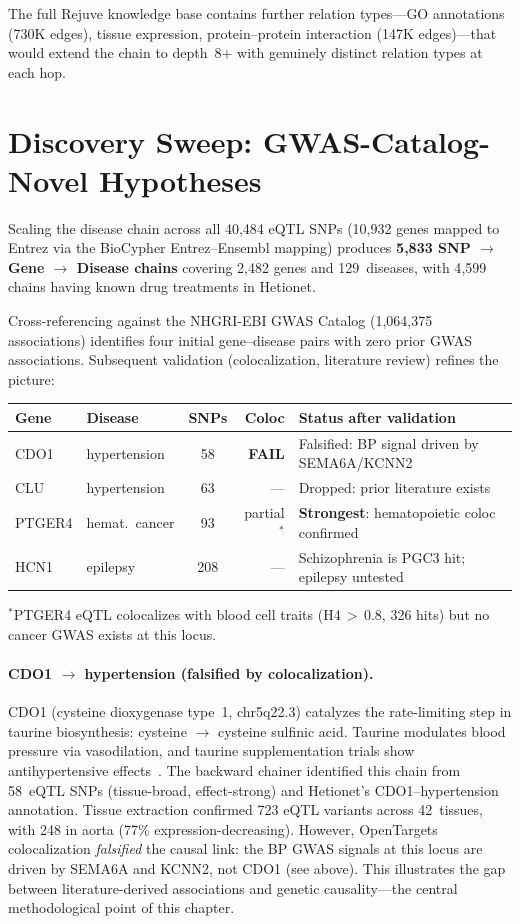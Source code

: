 \documentclass[11pt,openany]{report}
\begin{document}
The full Rejuve knowledge base contains further relation types---GO
annotations (730K edges), tissue expression, protein--protein
interaction (147K edges)---that would extend the chain to depth~8+
with genuinely distinct relation types at each hop.


\section{Discovery Sweep: GWAS-Catalog-Novel Hypotheses}
\label{sec:bio-discovery}

Scaling the disease chain across all 40{,}484 eQTL SNPs
(10{,}932 genes mapped to Entrez via the BioCypher
Entrez--Ensembl mapping) produces \textbf{5{,}833 SNP $\to$
Gene $\to$ Disease chains} covering 2{,}482 genes and
129~diseases, with 4{,}599 chains having known drug
treatments in Hetionet.

Cross-referencing against the NHGRI-EBI GWAS Catalog
(1{,}064{,}375 associations) identifies four initial gene--disease
pairs with zero prior GWAS associations.  Subsequent validation
(colocalization, literature review) refines the picture:

\begin{center}
\small
\begin{tabular}{llcrl}
\toprule
Gene & Disease & SNPs & Coloc & Status after validation \\
\midrule
CDO1   & hypertension   & 58  & \textbf{FAIL} & Falsified: BP signal driven by SEMA6A/KCNN2 \\
CLU    & hypertension   & 63  & ---  & Dropped: prior literature exists \\
PTGER4 & hemat.\ cancer & 93  & partial$^*$ & \textbf{Strongest}: hematopoietic coloc confirmed \\
HCN1   & epilepsy       & 208 & --- & Schizophrenia is PGC3 hit; epilepsy untested \\
\bottomrule
\end{tabular}
\end{center}
{\footnotesize $^*$PTGER4 eQTL colocalizes with blood cell
traits (H4\,$>$\,0.8, 326 hits) but no cancer GWAS exists at
this locus.}

\paragraph{CDO1 $\to$ hypertension (falsified by colocalization).}
CDO1 (cysteine dioxygenase type~1, chr5q22.3) catalyzes the
rate-limiting step in taurine biosynthesis: cysteine $\to$
cysteine sulfinic acid.  Taurine modulates blood pressure via
vasodilation, and taurine supplementation trials show
antihypertensive effects~\cite{Militante2002Taurine}.  The
backward chainer identified this chain from 58~eQTL SNPs
(tissue-broad, effect-strong) and Hetionet's CDO1--hypertension
annotation.  Tissue extraction confirmed 723 eQTL variants
across 42~tissues, with 248 in aorta (77\% expression-decreasing).
However, OpenTargets colocalization \emph{falsified} the causal
link: the BP GWAS signals at this locus are driven by SEMA6A
and KCNN2, not CDO1 (see above).  This illustrates the gap between
literature-derived associations and genetic causality---the
central methodological point of this chapter.
\end{document}

